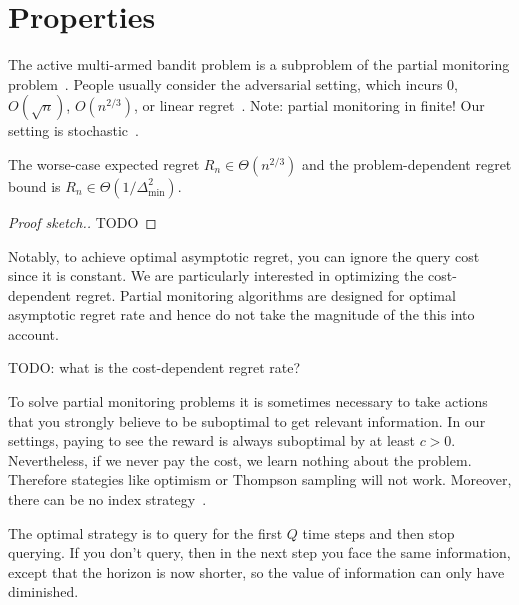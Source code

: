 \documentclass[a4paper]{article}
\begin{document}
\section{Properties}

The active multi-armed bandit problem is
a subproblem of the partial monitoring problem~\citep{Piccolboni01}.
People usually consider the adversarial setting,
which incurs $0$, $O(\sqrt{n})$, $O(n^{2/3})$, or linear regret~\citep{Antos13}.
Note: partial monitoring in finite!
Our setting is stochastic~\citep{Komiyama15}.


\begin{proposition}
The worse-case expected regret $R_n \in \Theta(n^{2/3})$
and the problem-dependent regret bound is $R_n \in \Theta(1/\Delta_{\min}^2)$.
\end{proposition}
\begin{proof}[Proof sketch.]
TODO
\end{proof}

Notably, to achieve optimal asymptotic regret, you can ignore the query cost since it is constant.
We are particularly interested in optimizing
the cost-dependent regret.
Partial monitoring algorithms are designed for optimal asymptotic regret rate and hence do not take the magnitude of the this into account.

TODO: what is the cost-dependent regret rate?

To solve partial monitoring problems
it is sometimes necessary to take actions that you strongly believe to be suboptimal to get relevant information.
In our settings, paying to see the reward is always suboptimal
by at least $c > 0$.
Nevertheless, if we never pay the cost, we learn nothing about the problem.
Therefore stategies like optimism or Thompson sampling will not work.
Moreover, there can be no index strategy~\citep[Ex.~4]{Hay12}.

The optimal strategy is to query for the first $Q$ time steps and then stop querying.
If you don't query, then in the next step you face the same information, except that the horizon is now shorter,
so the value of information can only have diminished.



\end{document}
